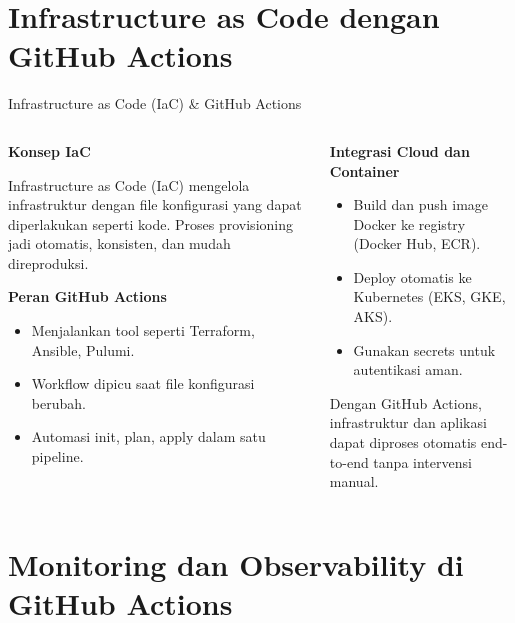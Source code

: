 \documentclass[aspectratio=169, table]{beamer}
\begin{document}
\section{Infrastructure as Code dengan GitHub Actions}

\begin{frame}[fragile]{Infrastructure as Code (IaC) \& GitHub Actions}
	\vspace{20pt}
	
	\begin{columns}[T]
		\begin{column}{0.6\textwidth}
			\textbf{Konsep IaC}
			
			Infrastructure as Code (IaC) mengelola infrastruktur dengan file konfigurasi yang dapat diperlakukan seperti kode. Proses provisioning jadi otomatis, konsisten, dan mudah direproduksi.
			
			\vspace{6pt}
			\textbf{Peran GitHub Actions}
			\begin{itemize}
				\item Menjalankan tool seperti Terraform, Ansible, Pulumi.
				\item Workflow dipicu saat file konfigurasi berubah.
				\item Automasi init, plan, apply dalam satu pipeline.
			\end{itemize}
		\end{column}
		
		\begin{column}{0.4\textwidth}
			\textbf{Integrasi Cloud dan Container}
			\begin{itemize}
				\item Build dan push image Docker ke registry (Docker Hub, ECR).
				\item Deploy otomatis ke Kubernetes (EKS, GKE, AKS).
				\item Gunakan secrets untuk autentikasi aman.
			\end{itemize}
			
			\vspace{8pt}
			Dengan GitHub Actions, infrastruktur dan aplikasi dapat diproses otomatis end-to-end tanpa intervensi manual.
		\end{column}
	\end{columns}
\end{frame}

\section{Monitoring dan Observability di GitHub Actions}
\end{document}
